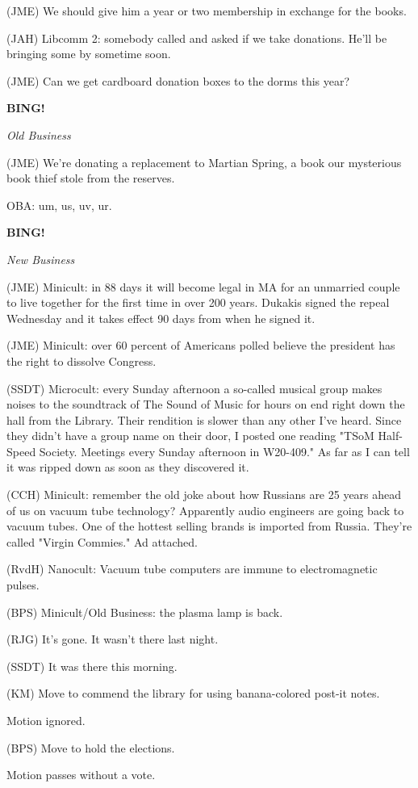 \documentclass[12pt]{article}
\newcommand{\bing}{{\bf BING!} }
\newcommand{\goto}[1]{\bing \vskip 12pt \centerline{{\em{#1}}}}
\begin{document}
(JME) We should give him a year or two membership in exchange for the books.

(JAH) Libcomm 2: somebody called and asked if we take donations. He'll be bringing some by sometime soon.

(JME) Can we get cardboard donation boxes to the dorms this year?

\goto{Old Business}

(JME) We're donating a replacement to Martian Spring, a book our mysterious book thief stole from the reserves.

OBA: um, us, uv, ur.

\goto{New Business}

(JME) Minicult: in 88 days it will become legal in MA for an unmarried couple to live together for the first time in over 200 years. Dukakis signed the repeal Wednesday and it takes effect 90 days from when he signed it.

(JME) Minicult: over 60 percent of Americans polled believe the president has the right to dissolve Congress.

(SSDT) Microcult: every Sunday afternoon a so-called musical group makes noises to the soundtrack of The Sound of Music for hours on end right down the hall from the Library. Their rendition is slower than any other I've heard. Since they didn't have a group name on their door, I posted one reading "TSoM Half-Speed Society. Meetings every Sunday afternoon in W20-409." As far as I can tell it was ripped down as soon as they discovered it.

(CCH) Minicult: remember the old joke about how Russians are 25 years ahead of us on vacuum tube technology? Apparently audio engineers are going back to vacuum tubes. One of the hottest selling brands is imported from Russia. They're called "Virgin Commies." Ad attached.

(RvdH) Nanocult: Vacuum tube computers are immune to electromagnetic pulses.

(BPS) Minicult/Old Business: the plasma lamp is back.

(RJG) It's gone. It wasn't there last night.

(SSDT) It was there this morning.

(KM) Move to commend the library for using banana-colored post-it notes.

Motion ignored.

(BPS) Move to hold the elections.

Motion passes without a vote.
\end{document}
